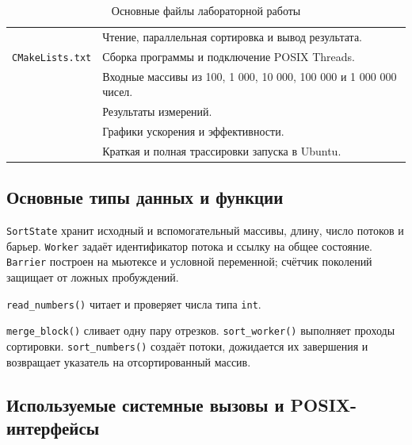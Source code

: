\documentclass[12pt, a4paper]{article}
\begin{document}
\begin{table}[H]
  \caption{Основные файлы лабораторной работы}
  \begin{tabularx}{\linewidth}{|P{5.1cm}|L|}
    \hline
     &  \\ \hline
     & Чтение, параллельная сортировка и вывод результата. \\ \hline
    \texttt{CMakeLists.txt} & Сборка программы и подключение POSIX Threads. \\ \hline
     & Входные массивы из 100, 1 000, 10 000, 100 000 и 1 000 000 чисел. \\ \hline
     & Результаты измерений. \\ \hline
     & Графики ускорения и эффективности. \\ \hline
     & Краткая и полная трассировки запуска в Ubuntu. \\ \hline
  \end{tabularx}
\end{table}

\subsection{Основные типы данных и функции}

\texttt{SortState} хранит исходный и вспомогательный массивы, длину,
число потоков и барьер. \texttt{Worker} задаёт идентификатор потока и ссылку
на общее состояние. \texttt{Barrier} построен на мьютексе и условной
переменной; счётчик поколений защищает от ложных пробуждений.

\texttt{read\_numbers()} читает и проверяет числа типа \texttt{int}.

\texttt{merge\_block()} сливает одну пару отрезков.
\texttt{sort\_worker()} выполняет проходы сортировки.
\texttt{sort\_numbers()} создаёт потоки, дожидается их завершения и
возвращает указатель на отсортированный массив.

\subsection{Используемые системные вызовы и POSIX-интерфейсы}
\end{document}
